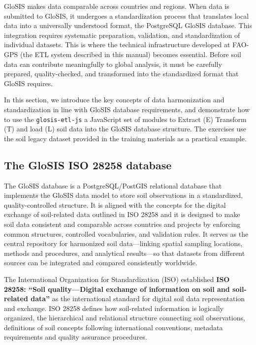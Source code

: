 \documentclass[
  10pt,
  b5paper,
  oneside]{book}
\begin{document}
GloSIS makes data comparable across countries and regions. When data is submitted to GloSIS, it undergoes a standardization process that translates local data into a universally understood format, the PostgreSQL GloSIS database. This integration requires systematic preparation, validation, and standardization of individual datasets. This is where the technical infrastructure developed at FAO-GPS (the ETL system described in this manual) becomes essential. Before soil data can contribute meaningfully to global analysis, it must be carefully prepared, quality-checked, and transformed into the standardized format that GloSIS requires.

In this section, we introduce the key concepts of data harmonization and standardization in line with GloSIS database requirements, and demonstrate how to use the \texttt{glosis-etl-js} a JavaScript set of modules to Extract (E) Transform (T) and load (L) soil data into the GloSIS database structure. The exercises use the soil legacy dataset provided in the training materials as a practical example.

\subsection{The GloSIS ISO 28258 database}\label{the-glosis-iso-28258-database}

The GloSIS database is a PostgreSQL/PostGIS relational database that implements the GloSIS data model to store soil observations in a standardized, quality-controlled structure. It is aligned with the concepts for the digital exchange of soil-related data outlined in ISO 28258 and it is designed to make soil data consistent and comparable across countries and projects by enforcing common structures, controlled vocabularies, and validation rules. It serves as the central repository for harmonized soil data---linking spatial sampling locations, methods and procedures, and analytical results---so that datasets from different sources can be integrated and compared consistently worldwide.

The International Organization for Standardization (ISO) established \textbf{ISO 28258: ``Soil quality---Digital exchange of information on soil and soil-related data''} as the international standard for digital soil data representation and exchange. ISO 28258 defines how soil-related information is logically organized, the hierarchical and relational structure connecting soil observations, definitions of soil concepts following international conventions, metadata requirements and quality assurance procedures.
\end{document}
